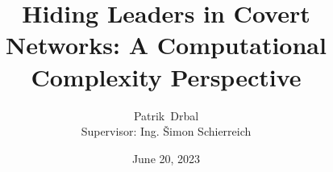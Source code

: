 \documentclass[aspectratio=169,compress]{beamer}
\title[Short Paper Title] %
{Hiding Leaders in Covert Networks:\linebreak
A Computational Complexity Perspective}
\author[Author, Another] %
{Patrik~Drbal\\[\baselineskip]Supervisor: Ing. Šimon Schierreich\\[\baselineskip]}
\date[Short Occasion] %
{June 20, 2023}
\newcommand{\HL}{\textsc{Hiding Leaders}\xspace}
\begin{document}
\begin{frame}
  \titlepage
\end{frame}





\appendix










\end{document}
